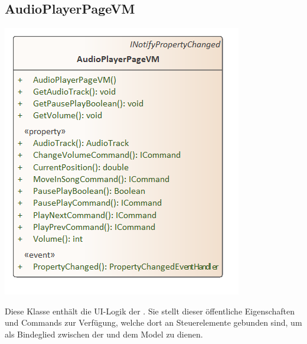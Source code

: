 \documentclass[../entwurf.tex]{subfiles}
\begin{document}
\subsection{AudioPlayerPageVM}
\begin{minipage}{0.5\textwidth}
\includegraphics[scale=0.75]{../graphics/vm_klassen/AudioPlayerPageVM.png}
\end{minipage}
\begin{minipage}{0.5\textwidth}
Diese Klasse enthält die UI-Logik der . Sie stellt dieser öffentliche Eigenschaften und Commands zur Verfügung, welche dort an Steuerelemente gebunden sind, um als Bindeglied zwischen der  und dem Model zu dienen.
\end{minipage}
\end{document}
